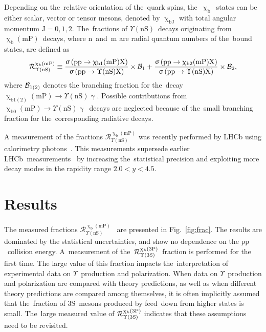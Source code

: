\documentclass[a4paper]{article}
\def\lhcb {\mbox{LHCb}\xspace}
\def\Pgamma      {\ensuremath{\upgamma}\xspace}
\def\Pchi        {\ensuremath{\upchi}\xspace}
\def\PUpsilon      {\ensuremath{\Upsilon}\xspace}
\def\Pa      {\ensuremath{\mathrm{a}}\xspace}
\def\Pb      {\ensuremath{\mathrm{b}}\xspace}
\def\Pp      {\ensuremath{\mathrm{p}}\xspace}
\def\g      {{\ensuremath{\Pgamma}}\xspace}
\def\bquark    {{\ensuremath{\Pb}}\xspace}
\def\Y#1S{\ensuremath{\PUpsilon\mathrm{(#1S)}}\xspace}%
\def\proton      {{\ensuremath{\Pp}}\xspace}
\def\BF         {{\ensuremath{\cal B}}\xspace}
\def\BR         {\BF}
\newcommand{\decay}[2]{\ensuremath{#1\!\to #2}\xspace}         %
\def\to                 {\ensuremath{\rightarrow}\xspace}
\def\chib           {\ensuremath{\Pchi_{\bquark}}\xspace}
\def\ups            {\ensuremath{\PUpsilon}\xspace}
\def\YnS            {\ensuremath{\PUpsilon\mathrm{(nS)}}\xspace}%
\def\chibthreep     {\ensuremath{\Pchi_{\bquark}\mathrm{(3P)}}\xspace}
\def\chibmp         {\ensuremath{\Pchi_{\bquark}\mathrm{(mP)}}\xspace}
\def\Rmn           {\ensuremath{\mathcal{R}^{\chibmp}_{\YnS}}\xspace}
\begin{document}
Depending on the~relative orientation of the~quark spins,
the~\chib~states can be either scalar, vector or tensor mesons, denoted by
$\Pchi_{\bquark \mathrm{J}}$ with total angular momentum $\mathrm{J}=0,1,2$.
The~fractions of \YnS~decays
originating from \chibmp~decays,
where $\mathrm{n}$~and~$\mathrm{m}$ are radial quantum numbers of
the~bound states, are defined as
\begin{equation}
  \mathcal{R}^{\chibmp}_{\YnS} \equiv
  \dfrac
      {\upsigma  \left( \proton\proton \to \Pchi_{\bquark1}\mathrm{(mP)} \mathrm{X} \right)}
      {\upsigma  \left( \proton\proton \to \YnS    \mathrm{X} \right)}
      \times \BR_1
      + \dfrac
      {\upsigma  \left( \proton\proton \to \Pchi_{\bquark2}\mathrm{(mP)} \mathrm{X} \right)}
      {\upsigma  \left( \proton\proton \to \YnS    \mathrm{X} \right)}
      \times \BR_2
      \label{eq:r},
\end{equation}
where $\BR_{1(2)}$ denotes the branching fraction 
for the~decay \decay{\Pchi_{\bquark1(2)}\mathrm{(mP)}}{\YnS \g}.
Possible contributions from \decay{\Pchi_{\bquark0}\mathrm{(mP)}}{\YnS \g}~decays 
are neglected because  of the~small branching fraction for the~corresponding
radiative decays.

A measurement of the fractions $\mathcal{R}^{\chibmp}_{\YnS}$ was
recently performed by LHCb using calorimetry photons~\cite{Aaij:1746553}.
This measurements supersede earlier \lhcb~measurements~\cite{LHCb-PAPER-2012-015,LHCb-CONF-2012-020}
by increasing the~statistical precision and exploiting more decay modes 
in the rapidity range  $2.0<y<4.5$.
\section{Results}
\label{sec:Conclusion}


The measured fractions \Rmn~\cite{Aaij:1746553} are presented in Fig.~\ref{fig:frac}.
The results are dominated by the statistical uncertainties, and show no dependence on the \proton\proton~collision energy.
A~measurement of the~$\mathcal{R}^{\chibthreep}_{\Y3S}$~fraction is performed for the first time.
The large value of this fraction impacts the~interpretation
of experimental data on \ups~production and polarization.
When data on \ups~production and polarization are compared with theory predictions,
as well as when different theory predictions are compared among themselves, it is often implicitly assumed
that the~fraction of \Y3S~mesons produced by feed~down from higher states is small.
The~large measured value of  $\mathcal{R}^{\chibthreep}_{\Y3S}$
indicates that these assumptions need to be revisited. 
\end{document}
